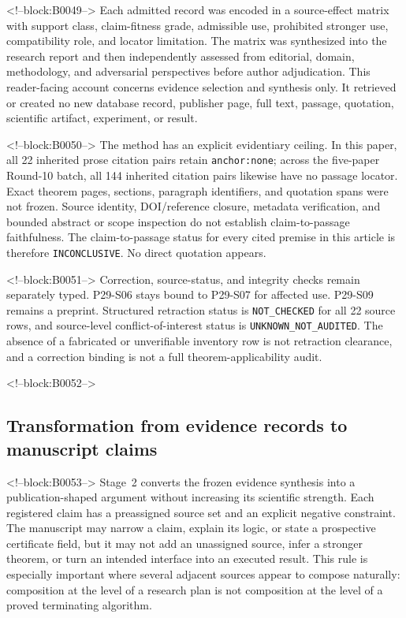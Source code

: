 \documentclass[11pt,a4paper]{article}
\begin{document}
<!--block:B0049-->
Each admitted record was encoded in a source-effect matrix with support class, claim-fitness grade, admissible use, prohibited stronger use, compatibility role, and locator limitation. The matrix was synthesized into the research report and then independently assessed from editorial, domain, methodology, and adversarial perspectives before author adjudication. This reader-facing account concerns evidence selection and synthesis only. It retrieved or created no new database record, publisher page, full text, passage, quotation, scientific artifact, experiment, or result.

<!--block:B0050-->
The method has an explicit evidentiary ceiling. In this paper, all 22 inherited prose citation pairs retain \texttt{anchor:none}; across the five-paper Round-10 batch, all 144 inherited citation pairs likewise have no passage locator. Exact theorem pages, sections, paragraph identifiers, and quotation spans were not frozen. Source identity, DOI/reference closure, metadata verification, and bounded abstract or scope inspection do not establish claim-to-passage faithfulness. The claim-to-passage status for every cited premise in this article is therefore \texttt{INCONCLUSIVE}. No direct quotation appears.

<!--block:B0051-->
Correction, source-status, and integrity checks remain separately typed. P29-S06 stays bound to P29-S07 for affected use. P29-S09 remains a preprint. Structured retraction status is \texttt{NOT\_CHECKED} for all 22 source rows, and source-level conflict-of-interest status is \texttt{UNKNOWN\_NOT\_AUDITED}. The absence of a fabricated or unverifiable inventory row is not retraction clearance, and a correction binding is not a full theorem-applicability audit.

<!--block:B0052-->
\subsection{Transformation from evidence records to manuscript claims}

<!--block:B0053-->
Stage~2 converts the frozen evidence synthesis into a publication-shaped argument without increasing its scientific strength. Each registered claim has a preassigned source set and an explicit negative constraint. The manuscript may narrow a claim, explain its logic, or state a prospective certificate field, but it may not add an unassigned source, infer a stronger theorem, or turn an intended interface into an executed result. This rule is especially important where several adjacent sources appear to compose naturally: composition at the level of a research plan is not composition at the level of a proved terminating algorithm.
\end{document}
